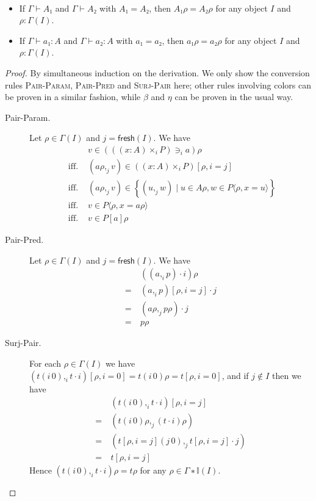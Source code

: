 \documentclass[english]{PaperTools/latex/lipics}
\newcommand\CTimes[2]{(#2) ×_{#1}}
\newcommand\param[1]{\!\cdot\!#1}
\newcommand\op[1]{∋_{#1}}
\def\fresh#1{\mathsf{fresh}(#1)}
\begin{document}
\begin{theorem}~
  \label{thm:convertible-in-model}
  \begin{itemize}
    \item If $Γ ⊢ A₁$ and $Γ ⊢ A₂$ with $A₁ = A₂$, then
      $A₁ρ = A₂ρ$ for any object $I$ and $ρ : Γ(I)$.
    \item If $Γ ⊢ a₁ : A$ and $Γ ⊢ a₂ : A$ with $a₁ = a₂$, then
      $a₁ρ = a₂ρ$ for any object $I$ and $ρ : Γ(I)$.
  \end{itemize}
\end{theorem}
\begin{proof}
  By simultaneous induction on the derivation.
  We only show the conversion rules \textsc{Pair-Param},
  \textsc{Pair-Pred} and \textsc{Surj-Pair} here; other rules involving
  colors can be proven in a similar fashion, while $β$ and $η$ can be
  proven in the usual way.

  \begin{description}
    \item[\sc Pair-Param.]
      Let $ρ ∈ Γ(I)$ and $j = \fresh I$.  We have
      \begin{align*}
        &v ∈ ({((x:A)\times_i P)} \op {i} a)ρ
        \\
        \text{ iff. }& (aρ ,_j v) ∈ (\CTimes i {x:A} P)[ρ,i=j]
        \\
        \text{ iff. }& (aρ ,_j v) ∈ \left\{ (u ,_j w) \mid u ∈ Aρ, w ∈ P⟨ρ,x=u⟩ \right\}
        \\
        \text{ iff. }& v ∈ P⟨ρ,x=aρ⟩
        \\
        \text{ iff. }& v ∈ P[a]ρ
      \end{align*}

    \item[\sc Pair-Pred.]
      Let $ρ ∈ Γ(I)$ and $j = \fresh I$.  We have
      \begin{align*}
         & ((a ,_i p) \param i)ρ
        \\=~& (a ,_i p)[ρ,i=j]·j
      \\=~& (aρ ,_j pρ) · j
      \\=~& pρ
      \end{align*}

    \item[\sc Surj-Pair.]
      For each $ρ ∈ Γ(I)$ we have
      $(t(i\,0) ,_i t·i)[ρ,i=0] = t(i\,0)ρ = t[ρ,i=0]$, and
      if $j ∉ I$ then we have
      \begin{align*}
        & (t(i\,0) ,_i t·i)[ρ,i=j]
        \\=~& (t(i\,0)ρ ,_j (t·i)ρ)
        \\=~& (t[ρ,i=j](j\,0) ,_j t[ρ,i=j]·j)
        \\=~& t[ρ,i=j]
      \end{align*}
      Hence $(t(i\,0) ,_i t·i)ρ = tρ$ for any $ρ ∈ Γ∗𝕀(I)$.
      \qedhere
  \end{description}
\end{proof}
\end{document}

